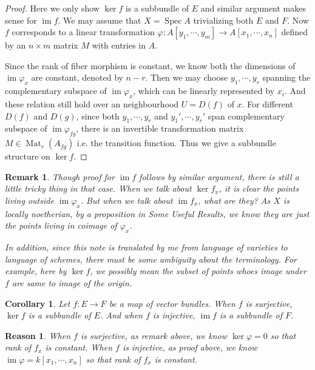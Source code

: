 \documentclass{ctexart}
\newtheorem{remark}{Remark}[section]
\newtheorem{reason}{Reason}[section]
\newtheorem{corollary}{Corollary}[section]
\newcommand{\im}{\operatorname{im}}
\newcommand{\spec}{\operatorname{Spec}}
\newcommand{\matrices}[2]{\operatorname{Mat}_{#1}(#2)}
\begin{document}
\begin{proof}
    Here we only show $\ker f$ is a subbundle of $E$ and similar argument makes sense for $\im f$.
    We may assume that $X = \spec A$ trivializing both $E$ and $F$.
    Now $f$ corresponds to a linear transformation $\varphi: A[y_{1}, \cdots, y_{m}] \rightarrow A[x_{1}, \cdots, x_{n}]$ defined by an $n \times m$ matrix $M$ with entries in $A$.
    \par
    Since the rank of fiber morphism is constant, we know both the dimensions of $\im \varphi_{x}$ are constant, denoted by $n - r$.
    Then we may choose $y_{1}, \cdots, y_{r}$ spanning the complementary subspace of $\im \varphi_{x}$, which can be linearly represented by $x_{i}$.
    And these relation still hold over an neighbourhood $U = D(f)$ of $x$.
    For different $D(f)$ and $D(g)$, since both $y_{1}, \cdots, y_{r}$ and $y_{1}', \cdots, y_{r}'$ span complementary subspace of $\im \varphi_{fg}$,
    there is an invertible transformation matrix $M\in \matrices{r}{A_{fg}}$ i.e. the transition function.
    Thus we give a subbundle structure on $\ker f$.
\end{proof}
\begin{remark}
    Though proof for $\im f$ follows by similar argument, there is still a little tricky thing in that case.
    When we talk about $\ker f_{x}$, it is clear the points living outside $\im \varphi_{x}$.
    But when we talk about $\im f_{x}$, what are they?
    As $X$ is locally noetherian, by a proposition in Some Useful Results, we know they are just the points living in coimage of $\varphi_{x}$.
    \par
    In addition, since this note is translated by me from language of varieties to language of schemes,
    there must be some ambiguity about the terminology.
    For example, here by $\ker f$, we possibly mean the subset of points whoes image under $f$ are same to image of the origin.
\end{remark}
\begin{corollary}
    Let $f: E \rightarrow F$ be a map of vector bundles.
    When $f$ is surjective, $\ker f$ is a subbundle of $E$.
    And when $f$ is injective, $\im f$ is a subbundle of $F$.
    \label{Corollary 1.2}
\end{corollary}
\begin{reason}
    When $f$ is surjective, as remark above, we know $\ker \varphi = 0$ so that rank of $f_{x}$ is constant.
    When $f$ is injective, as proof above, we know $\im \varphi = k[x_{1}, \cdots, x_{n}]$ so that rank of $f_{x}$ is constant.
\end{reason}
\end{document}
